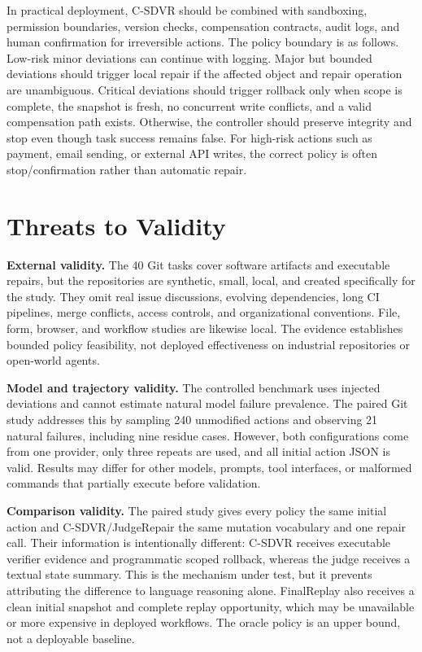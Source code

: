 \documentclass[pdflatex,sn-apa]{sn-jnl}
\begin{document}
In practical deployment, C-SDVR should be combined with sandboxing, permission boundaries, version checks, compensation contracts, audit logs, and human confirmation for irreversible actions. The policy boundary is as follows. Low-risk minor deviations can continue with logging. Major but bounded deviations should trigger local repair if the affected object and repair operation are unambiguous. Critical deviations should trigger rollback only when scope is complete, the snapshot is fresh, no concurrent write conflicts, and a valid compensation path exists. Otherwise, the controller should preserve integrity and stop even though task success remains false. For high-risk actions such as payment, email sending, or external API writes, the correct policy is often stop/confirmation rather than automatic repair.

\section{Threats to Validity}

\textbf{External validity.} The 40 Git tasks cover software artifacts and executable repairs, but the repositories are synthetic, small, local, and created specifically for the study. They omit real issue discussions, evolving dependencies, long CI pipelines, merge conflicts, access controls, and organizational conventions. File, form, browser, and workflow studies are likewise local. The evidence establishes bounded policy feasibility, not deployed effectiveness on industrial repositories or open-world agents.

\textbf{Model and trajectory validity.} The controlled benchmark uses injected deviations and cannot estimate natural model failure prevalence. The paired Git study addresses this by sampling 240 unmodified actions and observing 21 natural failures, including nine residue cases. However, both configurations come from one provider, only three repeats are used, and all initial action JSON is valid. Results may differ for other models, prompts, tool interfaces, or malformed commands that partially execute before validation.

\textbf{Comparison validity.} The paired study gives every policy the same initial action and C-SDVR/JudgeRepair the same mutation vocabulary and one repair call. Their information is intentionally different: C-SDVR receives executable verifier evidence and programmatic scoped rollback, whereas the judge receives a textual state summary. This is the mechanism under test, but it prevents attributing the difference to language reasoning alone. FinalReplay also receives a clean initial snapshot and complete replay opportunity, which may be unavailable or more expensive in deployed workflows. The oracle policy is an upper bound, not a deployable baseline.
\end{document}
